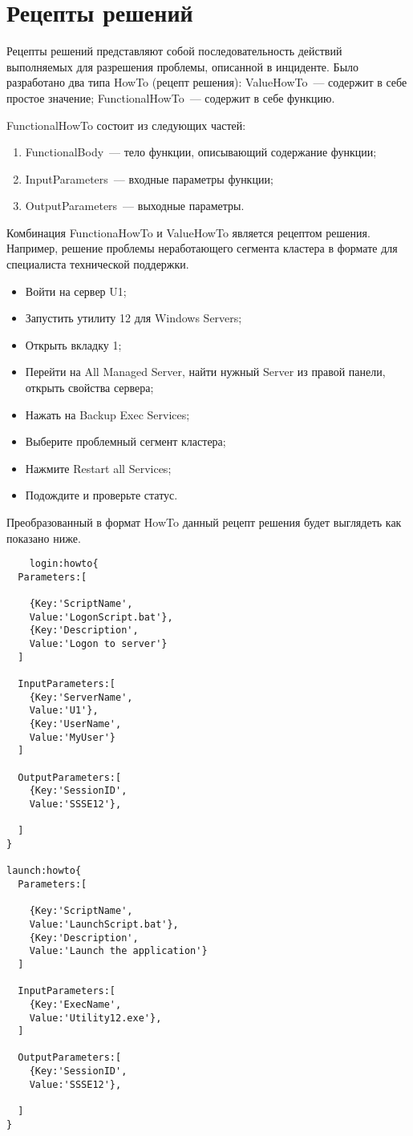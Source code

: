 \chapter{Рецепты решений} \label{AppendixDHowTo}
Рецепты решений представляют собой последовательность действий выполняемых для разрешения проблемы, описанной в инциденте. 
Было разработано два типа HowTo (рецепт решения): ValueHowTo~--- содержит в себе простое значение; FunctionalHowTo~--- содержит в себе функцию. \par
FunctionalHowTo состоит из следующих частей:
\begin{enumerate}
	\item FunctionalBody~--- тело функции, описывающий содержание функции;
	\item InputParameters~--- входные параметры функции;
	\item OutputParameters~--- выходные параметры.
\end{enumerate} \par
Комбинация FunctionaHowTo и ValueHowTo является рецептом решения. Например, решение проблемы неработающего сегмента кластера в формате для специалиста технической поддержки.
\begin{itemize}
	\item Войти на сервер U1;
	\item Запустить утилиту 12 для Windows Servers;
	\item Открыть вкладку 1;
	\item Перейти на All Managed Server, найти нужный Server из правой панели, открыть свойства сервера;
	\item Нажать на Backup Exec Services;
	\item Выберите проблемный сегмент кластера;
	\item Нажмите Restart all Services;
	\item Подождите и проверьте статус.
\end{itemize} \par
Преобразованный в формат HowTo данный рецепт решения будет выглядеть как показано ниже.

\begin{lstlisting}
	login:howto{
  Parameters:[

    {Key:'ScriptName',
    Value:'LogonScript.bat'},
    {Key:'Description',
    Value:'Logon to server'}
  ]

  InputParameters:[
    {Key:'ServerName',
    Value:'U1'},
    {Key:'UserName',
    Value:'MyUser'}
  ]

  OutputParameters:[
    {Key:'SessionID',
    Value:'SSSE12'},

  ]
}

launch:howto{
  Parameters:[

    {Key:'ScriptName',
    Value:'LaunchScript.bat'},
    {Key:'Description',
    Value:'Launch the application'}
  ]

  InputParameters:[
    {Key:'ExecName',
    Value:'Utility12.exe'},
  ]

  OutputParameters:[
    {Key:'SessionID',
    Value:'SSSE12'},

  ]
}
\end{lstlisting}
\clearpage
